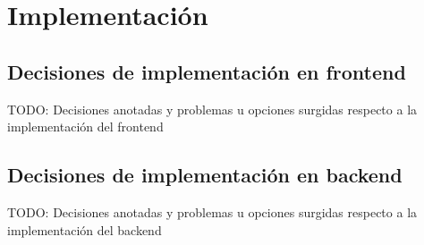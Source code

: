 \chapter{Implementación}

\section{Decisiones de implementación en frontend}

TODO: Decisiones anotadas y problemas u opciones surgidas respecto a la implementación del frontend \\

\section{Decisiones de implementación en backend}

TODO: Decisiones anotadas y problemas u opciones surgidas respecto a la implementación del backend



